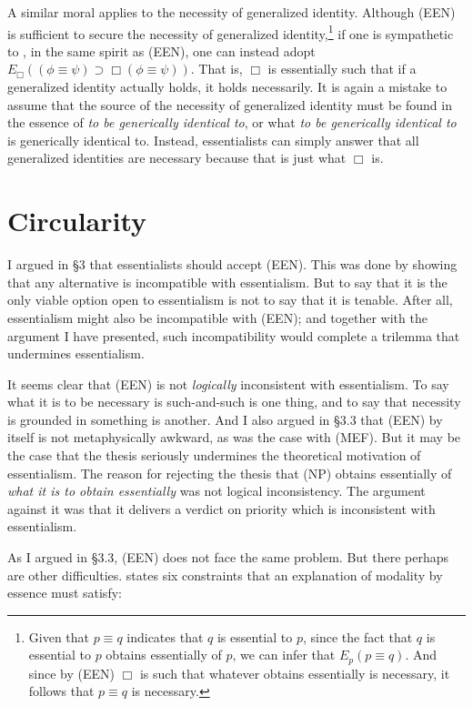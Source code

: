 \documentclass[12pt]{article}
\begin{document}
\par
A similar moral applies to the necessity of generalized identity. Although (EEN) is sufficient to secure the necessity of generalized identity,\footnote{Given that $p \equiv q$ indicates that $q$ is essential to $p$, since the fact that $q$ is essential to $p$ obtains essentially of $p$, we can infer that $E_p (p \equiv q)$. And since by (EEN) $\Box$ is such that whatever obtains essentially is necessary, it follows that $p \equiv q$ is necessary.} if one is sympathetic to \citet{Correia2017-CORGEA}, in the same spirit as (EEN), one can instead adopt $E_\Box ((\phi \equiv \psi) \supset \Box(\phi \equiv \psi))$. That is, $\Box$ is essentially such that if a generalized identity actually holds, it holds necessarily. It is again a mistake to assume that the source of the necessity of generalized identity must be found in the essence of \textit{to be generically identical to}, or what \textit{to be generically identical to} is generically identical to. Instead, essentialists can simply answer that all generalized identities are necessary because that is just what $\Box$ is. 


\section{Circularity}
I argued in \S 3 that essentialists should accept (EEN). This was done by showing that any alternative is incompatible with essentialism. But to say that it is the only viable option open to essentialism is not to say that it is tenable. After all, essentialism might also be incompatible with (EEN); and together with the argument I have presented, such incompatibility would complete a trilemma that undermines essentialism.
\par
It seems clear that (EEN) is not \textit{logically} inconsistent with essentialism. To say what it is to be necessary is such-and-such is one thing, and to say that necessity is grounded in something is another. And I also argued in \S 3.3 that (EEN) by itself is not metaphysically awkward, as was the case with (MEF). But it may be the case that the thesis seriously undermines the theoretical motivation of essentialism. The reason for rejecting the thesis that (NP) obtains essentially of \textit{what it is to obtain essentially} was not logical inconsistency. The argument against it was that it delivers a verdict on priority which is inconsistent with essentialism. 
\par
As I argued in \S 3.3, (EEN) does not face the same problem. But there perhaps are other difficulties. \citet[124]{Romero2019-ROMMIN} states six constraints that an explanation of modality by essence must satisfy: 
\end{document}
